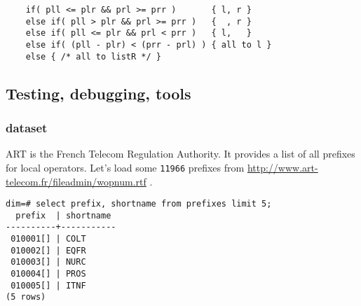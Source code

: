 \documentclass{beamer}
\begin{document}
\begin{frame}[fragile]
\begin{overprint}
  \begin{example}
  \begin{verbatim}
    if( pll <= plr && prl >= prr )       { l, r }
    else if( pll > plr && prl >= prr )   {  , r }
    else if( pll <= plr && prl < prr )   { l,   }
    else if( (pll - plr) < (prr - prl) ) { all to l }
    else { /* all to listR */ }
  \end{verbatim}
  \end{example}

  \end{overprint}

\end{frame}

\subsection{Testing, debugging, tools}

\begin{frame}[fragile]
  \frametitle{dataset}

  ART is the French Telecom Regulation Authority. It provides a list of all
  prefixes for local operators. Let's load some \texttt{11966} prefixes from
  \url{http://www.art-telecom.fr/fileadmin/wopnum.rtf} .

  \pause

  \begin{example}
  \begin{verbatim}
dim=# select prefix, shortname from prefixes limit 5;                                                                                                              
  prefix  | shortname 
----------+-----------
 010001[] | COLT
 010002[] | EQFR
 010003[] | NURC
 010004[] | PROS
 010005[] | ITNF
(5 rows)
  \end{verbatim}
  \end{example}

\end{frame}
\end{document}
